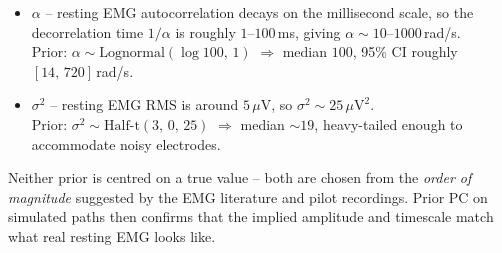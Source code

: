 \documentclass[11pt,a4paper]{article}
\begin{document}
\begin{itemize}\setlength{\itemsep}{0pt}
    \item \textbf{$\alpha$} -- resting EMG autocorrelation decays on
          the millisecond scale, so the decorrelation time
          $1/\alpha$ is roughly $1$--$100$\,ms, giving
          $\alpha \sim 10$--$1000$\,rad/s.\\
          Prior: $\alpha \sim \mathrm{Lognormal}(\log 100,\, 1)$
          $\Rightarrow$ median $100$, 95\% CI roughly
          $[14,\,720]$\,rad/s.
    \item \textbf{$\sigma^2$} -- resting EMG RMS is around
          $5\,\mu$V, so $\sigma^2 \sim 25\,\mu\mathrm{V}^2$.\\
          Prior: $\sigma^2 \sim \mathrm{Half\text{-}t}(3,\, 0,\, 25)$
          $\Rightarrow$ median $\sim 19$, heavy-tailed enough to
          accommodate noisy electrodes.
\end{itemize}

\noindent Neither prior is centred on a true value -- both are
chosen from the \emph{order of magnitude} suggested by the EMG
literature and pilot recordings. Prior PC on simulated paths then
confirms that the implied amplitude and timescale match what real
resting EMG looks like.
\end{document}
